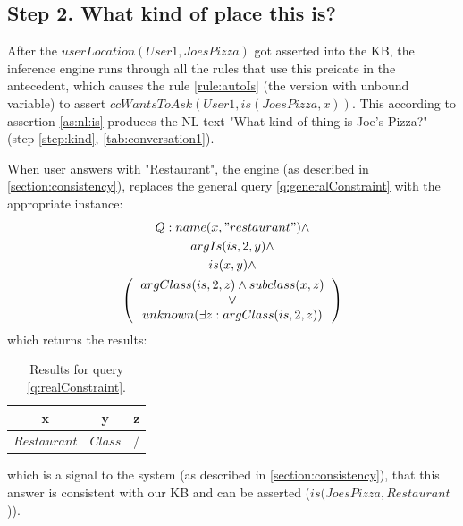 \subsection{Step 2. What kind of place this is?}
\label{section:step2}
After the $userLocation(User1,JoesPizza)$ got asserted into the KB, the 
inference engine runs through all the rules that use this preicate in the
antecedent, which causes the rule \ref{rule:autoIs} (the version with unbound
variable) to assert $ccWantsToAsk(User1, is(JoesPizza,x))$. This according to
assertion \ref{as:nl:is} produces the NL text 
"What kind of thing is Joe's Pizza?" (step \autoref{step:kind}, 
\autoref{tab:conversation1}).

When user answers with "Restaurant", the engine (as described in 
\autoref{section:consistency}), replaces the general query 
\ref{q:generalConstraint} with the appropriate instance:
\begin{equation}\label{q:realConstraint}
\begin{gathered}
    Q:name(x,"restaurant")\land \\ %
    argIs(is,2,y)\land \\ %
    is(x,y)\land \\
    \left(
    \begin{tabular}{c}
        $argClass(is,2,z) \land subclass(x,z)$\\
        $\lor$\\
        $unknown(\exists z:argClass(is,2,z))$ \\
    \end{tabular}
    \right)
\end{gathered}
\end{equation}
which returns the results:
\begin{table}[H]
\centering
\caption{Results for query \ref{q:realConstraint}.}
\label{tab:realConstraintResults}
\begin{tabular}{|c|c|c|}
	\hline
	\textbf{x} & \textbf{y} & \textbf{z} \\
    \hline
    $Restaurant$ & $Class$ & / \\
    \hline
\end{tabular}
\end{table}
which is a signal to the system (as described in \autoref{section:consistency}),
that this answer is consistent with our KB and can be asserted 
($is(JoesPizza,Restaurant$)).

